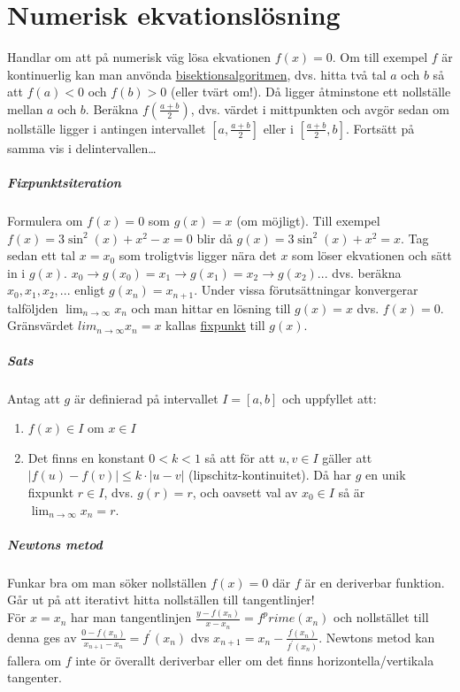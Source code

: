 \chapter{Numerisk ekvationslösning}
Handlar om att på numerisk väg lösa ekvationen $f(x)=0$.
Om till exempel $f$ är kontinuerlig kan man anvönda \underline{bisektionsalgoritmen}, dvs. hitta två tal $a$ och $b$ så att $f(a)<0$ och $f(b)>0$ (eller tvärt om!).
Då ligger åtminstone ett nollställe mellan $a$ och $b$.
Beräkna $f(\frac{a+b}{2})$, dvs. värdet i mittpunkten och avgör sedan om nollställe ligger i antingen intervallet $[a,\frac{a+b}{2}]$ eller i $[\frac{a+b}{2}, b]$.
Fortsätt på samma vis i delintervallen\dots

\paragraph{Fixpunktsiteration} Formulera om $f(x)=0$ som $g(x)=x$ (om möjligt).
Till exempel $f(x)=3\sin^2(x)+x^2-x=0$ blir då $g(x)=3\sin^2(x)+x^2=x$.
Tag sedan ett tal $x=x_0$ som troligtvis ligger nära det $x$ som löser ekvationen och sätt in i $g(x)$.
$x_0\rightarrow g(x_0)=x_1\rightarrow g(x_1)=x_2\rightarrow g(x_2)...$ dvs. beräkna $x_0,x_1,x_2,...$ enligt $g(x_n)=x_{n+1}$.
Under vissa förutsättningar konvergerar talföljden $\lim_{n\to\infty}x_n$ och man hittar en lösning till $g(x)=x$ dvs. $f(x)=0$.
Gränsvärdet $lim_{n\to\infty}x_n=x$ kallas \underline{fixpunkt} till $g(x)$.

\paragraph{Sats} Antag att $g$ är definierad på intervallet $I=[a,b]$ och uppfyllet att:
\begin{enumerate}
    \item $f(x)\in I$ om $x\in I$
    \item Det finns en konstant $0<k<1$ så att för att $u,v\in I$ gäller att $|f(u)-f(v)|\leq k\cdot|u-v|$ (lipschitz-kontinuitet).
          Då har $g$ en unik fixpunkt $r\in I$, dvs. $g(r)=r$, och oavsett val av $x_0\in I$ så är $\lim_{n\to\infty}x_n=r$.
\end{enumerate}

\paragraph{Newtons metod} Funkar bra om man söker nollställen $f(x)=0$ där $f$ är en deriverbar funktion.
Går ut på att iterativt hitta nollställen till tangentlinjer!\\
För $x=x_n$ har man tangentlinjen $\frac{y-f(x_n)}{x-x_n}=f^prime(x_n)$ och nollstället till denna ges av $\frac{0-f(x_n)}{x_{n+1}-x_n}=f^\prime(x_n)$ dvs $x_{n+1}=x_n-\frac{f(x_n)}{f^\prime(x_n)}$.
Newtons metod kan fallera om $f$ inte ör överallt deriverbar eller om det finns horizontella/vertikala tangenter.

